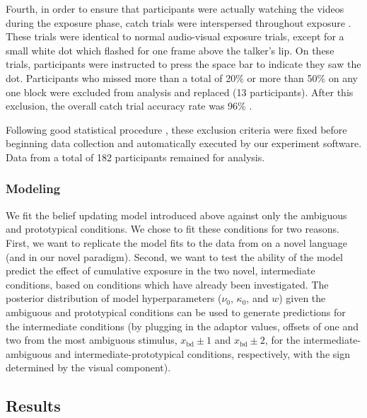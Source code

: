 Fourth, in order to ensure that participants were actually watching the videos during the exposure phase, catch trials were interspersed throughout exposure \autocite[as in][]{Vroomen2007}.  These trials were identical to normal audio-visual exposure trials, except for a small white dot which flashed for one frame above the talker's lip.  On these trials, participants were instructed to press the space bar to indicate they saw the dot.  Participants who missed more than a total of 20\% or more than 50\% on any one block were excluded from analysis and replaced (13 participants).  After this exclusion, the overall catch trial accuracy rate was 96\% \autocite[compared to 93\% reported by][]{Vroomen2007}.

Following good statistical procedure \cite{Simmons2011}, these exclusion criteria were fixed before beginning data collection and automatically executed by our experiment software.
Data from a total of 182 participants remained for analysis.

\subsubsection{Modeling}
\label{sec:modeling-intr-analysis}

We fit the belief updating model introduced above against only the ambiguous and prototypical conditions.  We chose to fit these conditions for two reasons.  First, we want to replicate the model fits to the data from  on a novel language (and in our novel paradigm).  Second, we want to test the ability of the model predict the effect of cumulative exposure in the two novel, intermediate conditions, based on conditions which have already been investigated.  The posterior distribution of model hyperparameters ($\nu_0$, $\kappa_0$, and $w$) given the ambiguous and prototypical conditions can be used to generate predictions for the intermediate conditions (by plugging in the adaptor values, offsets of one and two from the most ambiguous stimulus, $x_\mathrm{bd} \pm 1$ and $x_\mathrm{bd} \pm 2$, for the intermediate-ambiguous and intermediate-prototypical conditions, respectively, with the sign determined by the visual component).

\subsection{Results}
\label{sec:results-4}

